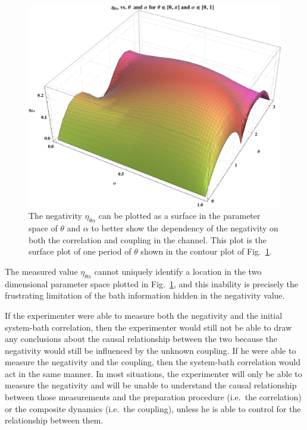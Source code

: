 \begin{figure}[t!h]
\centering
\includegraphics[scale=0.38]{eatthetaalphaIII.png}
\caption{The negativity $\eta_{\theta\alpha}$ can be plotted as a surface in the parameter space of $\theta$ and $\alpha$ to better show the dependency of the negativity on both the correlation and coupling in the channel.  This plot is the surface plot of one period of $\theta$ shown in the contour plot of Fig.\ \ref{fig:etathetaalpha}.}
\label{fig:etathetaalpha}
\end{figure}

The measured value $\eta_{\theta\alpha}$ cannot uniquely identify a location in the two dimensional parameter space plotted in Fig.\ \ref{fig:etathetaalpha}, and this inability is precisely the frustrating limitation of the bath information hidden in the negativity value.  

If the experimenter were able to measure both the negativity and the initial system-bath correlation, then the experimenter would still not be able to draw any conclusions about the causal relationship between the two because the negativity would still be influenced by the unknown coupling.  If he were able to measure the negativity and the coupling, then the system-bath correlation would act in the same manner.  In most situations, the experimenter will only be able to measure the negativity and will be unable to understand the causal relationship between those measurements and the preparation procedure (i.e.\ the correlation) or the composite dynamics (i.e.\ the coupling), unless he is able to control for the relationship between them.   

